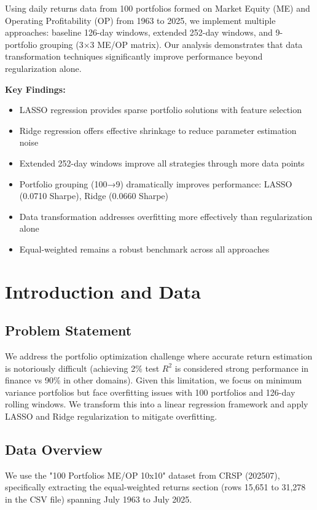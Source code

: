 \documentclass[12pt]{article}
\begin{document}
Using daily returns data from 100 portfolios formed on Market Equity (ME) and Operating Profitability (OP) from 1963 to 2025, we implement multiple approaches: baseline 126-day windows, extended 252-day windows, and 9-portfolio grouping (3×3 ME/OP matrix). Our analysis demonstrates that data transformation techniques significantly improve performance beyond regularization alone.

\textbf{Key Findings:}
\begin{itemize}
    \item LASSO regression provides sparse portfolio solutions with feature selection
    \item Ridge regression offers effective shrinkage to reduce parameter estimation noise
    \item Extended 252-day windows improve all strategies through more data points
    \item Portfolio grouping (100→9) dramatically improves performance: LASSO (0.0710 Sharpe), Ridge (0.0660 Sharpe)
    \item Data transformation addresses overfitting more effectively than regularization alone
    \item Equal-weighted remains a robust benchmark across all approaches
\end{itemize}

\section{Introduction and Data}

\subsection{Problem Statement}
We address the portfolio optimization challenge where accurate return estimation is notoriously difficult (achieving 2\% test $R^2$ is considered strong performance in finance vs 90\% in other domains). Given this limitation, we focus on minimum variance portfolios but face overfitting issues with 100 portfolios and 126-day rolling windows. We transform this into a linear regression framework and apply LASSO and Ridge regularization to mitigate overfitting.

\subsection{Data Overview}
We use the "100 Portfolios ME/OP 10x10" dataset from CRSP (202507), specifically extracting the equal-weighted returns section (rows 15,651 to 31,278 in the CSV file) spanning July 1963 to July 2025.
\end{document}
